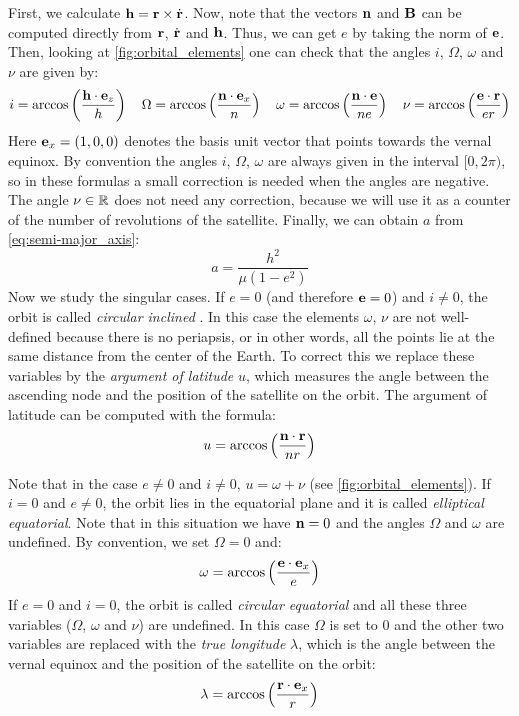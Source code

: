 \documentclass[../main.tex]{subfiles}
\begin{document}
First, we calculate $\boldsymbol{\mathrm{h}}=\boldsymbol{\mathrm{r}}\times\dot{\boldsymbol{\mathrm{r}}}$. Now, note that the vectors $\boldsymbol{\mathrm{n}}$ and $\boldsymbol{\mathrm{B}}$ can be computed directly from $\boldsymbol{\mathrm{r}}$, $\dot{\boldsymbol{\mathrm{r}}}$ and $\boldsymbol{\mathrm{h}}$. Thus, we can get $e$ by taking the norm of $\boldsymbol{\mathrm{e}}$. Then, looking at \cref{fig:orbital_elements} one can check that the angles $i$, $\Omega$, $\omega$ and $\nu$ are given by:
\begin{equation}
  i=\arccos\left(\frac{\boldsymbol{\mathrm{h}}\cdot \boldsymbol{\mathrm{e}}_z}{h}\right)\quad \Omega=\arccos\left(\frac{\boldsymbol{\mathrm{n}}\cdot \boldsymbol{\mathrm{e}}_x}{n}\right)\quad \omega=\arccos\left(\frac{\boldsymbol{\mathrm{n}}\cdot \boldsymbol{\mathrm{e}}}{ne}\right)\quad \nu=\arccos\left(\frac{\boldsymbol{\mathrm{e}}\cdot \boldsymbol{\mathrm{r}}}{er}\right)
\end{equation}
Here $\boldsymbol{\mathrm{e}}_x=(1,0,0)$ denotes the basis unit vector that points towards the vernal equinox. By convention the angles $i$, $\Omega$, $\omega$ are always given in the interval $[0,2\pi)$, so in these formulas a small correction is needed when the angles are negative. The angle $\nu\in\mathbb{R}$ does not need any correction, because we will use it as a counter of the number of revolutions of the satellite. Finally, we can obtain $a$ from \cref{eq:semi-major_axis}:
\begin{equation}
  a = \frac{h^2}{\mu(1-e^2)}
\end{equation}
Now we study the singular cases. If $e=0$ (and therefore $\boldsymbol{\mathrm{e}}=0$) and $i\ne 0$, the orbit is called \emph{circular inclined} \cite{vallado}. In this case the elements $\omega$, $\nu$ are not well-defined because there is no periapsis, or in other words, all the points lie at the same distance from the center of the Earth. To correct this we replace these variables by the \emph{argument of latitude} $u$, which measures the angle between the ascending node and the position of the satellite on the orbit. The argument of latitude can be computed with the formula:
\begin{equation}
  u=\arccos\left(\frac{\boldsymbol{\mathrm{n}}\cdot \boldsymbol{\mathrm{r}}}{nr}\right)
\end{equation}

Note that in the case $e\ne 0$ and $i\ne 0$, $u=\omega+\nu$ (see \cref{fig:orbital_elements}). If $i=0$ and $e\ne 0$, the orbit lies in the equatorial plane and it is called \emph{elliptical equatorial}. Note that in this situation we have $\boldsymbol{\mathrm{n}}=0$ and the angles $\Omega$ and $\omega$ are undefined. By convention, we set $\Omega=0$ and:
\begin{equation}
  \omega=\arccos\left(\frac{\boldsymbol{\mathrm{e}}\cdot \boldsymbol{\mathrm{e}}_x}{e}\right)
\end{equation}
If $e=0$ and $i=0$, the orbit is called \emph{circular equatorial} and all these three variables ($\Omega$, $\omega$ and $\nu$) are undefined. In this case $\Omega$ is set to 0 and the other two variables are replaced with the \emph{true longitude} $\lambda$, which is the angle between the vernal equinox and the position of the satellite on the orbit:
\begin{equation}
  \lambda = \arccos\left(\frac{\boldsymbol{\mathrm{r}}\cdot\boldsymbol{\mathrm{e}}_x}{r}\right)
\end{equation}
\end{document}
